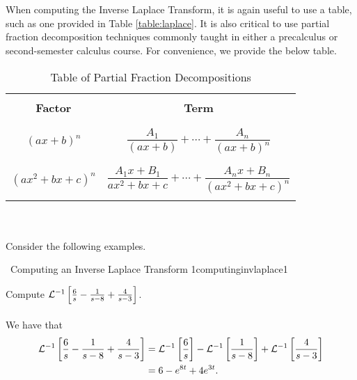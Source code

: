         \pagebreak
        \vphantom
        \\
        \\
        When computing the Inverse Laplace Transform, it is again useful to use a table, such as one provided in Table \ref{table:laplace}. It is also critical to use partial fraction decomposition techniques commonly taught in either a precalculus or second-semester calculus course. For convenience, we provide the below table.
        \begin{table}[h!]
            \centering
            \begin{tabular}{||c|c||}
                \hline
                \hspace{5em} & \hspace{15em} \\
                \textbf{Factor} & \textbf{Term} \\
                & \\ \hline \hline
                & \\
                \((ax+b)^n\) & \(\dfrac{A_1}{(ax+b)}+\cdots+\dfrac{A_n}{(ax+b)^n}\) \\
                & \\ \hline
                & \\
                \((ax^2+bx+c)^n\) & \(\dfrac{A_1x+B_1}{ax^2+bx+c}+\cdots+\dfrac{A_nx+B_n}{(ax^2+bx+c)^n}\) \\
                & \\ \hline
            \end{tabular}
            \caption{Table of Partial Fraction Decompositions}
            \label{table:pfds}
        \end{table}
        \vphantom
        \\
        \\
        Consider the following examples.
        \begin{example}{\Difficulty\,\Difficulty\,\,Computing an Inverse Laplace Transform 1}{computinginvlaplace1}

            Compute \(\laplace[-1]{\frac{6}{s}-\frac{1}{s-8}+\frac{4}{s-3}}\).
            \\
            \\
            We have that
            \begin{align*}
                \laplace[-1]{\frac{6}{s}-\frac{1}{s-8}+\frac{4}{s-3}}&=\laplace[-1]{\frac{6}{s}}-\laplace[-1]{\frac{1}{s-8}}+\laplace[-1]{\frac{4}{s-3}} \\
                &=6-e^{8t}+4e^{3t}.
            \end{align*}
            
        \end{example}
